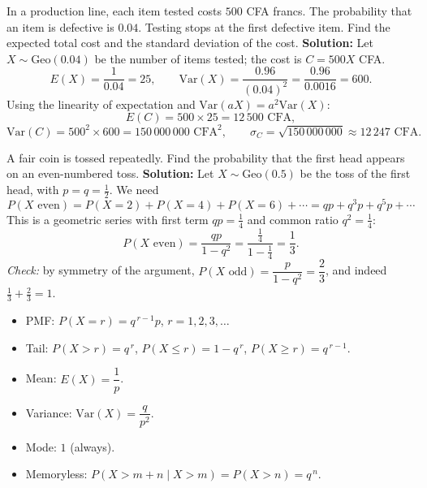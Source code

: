 \documentclass[11pt]{article}
\begin{document}
\begin{exoresolu}
In a production line, each item tested costs $500$ CFA francs. The probability that an item is defective is $0.04$. Testing stops at the first defective item. Find the expected total cost and the standard deviation of the cost.
\tcblower
\textbf{Solution:}
Let $X \sim \mathrm{Geo}(0.04)$ be the number of items tested; the cost is $C = 500X$ CFA.
\[
E(X) = \frac{1}{0.04} = 25, \qquad \mathrm{Var}(X) = \frac{0.96}{(0.04)^2} = \frac{0.96}{0.0016} = 600.
\]
Using the linearity of expectation and $\mathrm{Var}(aX)=a^2\mathrm{Var}(X)$:
\[
E(C) = 500 \times 25 = 12\,500 \text{ CFA},
\]
\[
\mathrm{Var}(C) = 500^2 \times 600 = 150\,000\,000 \text{ CFA}^2,
\qquad
\sigma_C = \sqrt{150\,000\,000} \approx 12\,247 \text{ CFA}.
\]
\end{exoresolu}

\begin{exoresolu}
A fair coin is tossed repeatedly. Find the probability that the first head appears on an even-numbered toss.
\tcblower
\textbf{Solution:}
Let $X \sim \mathrm{Geo}(0.5)$ be the toss of the first head, with $p=q=\tfrac12$. We need
\[
P(X \text{ even}) = P(X=2) + P(X=4) + P(X=6) + \cdots = qp + q^3p + q^5p + \cdots
\]
This is a geometric series with first term $qp = \tfrac14$ and common ratio $q^2 = \tfrac14$:
\[
P(X \text{ even}) = \frac{qp}{1-q^2} = \frac{\tfrac14}{1-\tfrac14} = \frac{1}{3}.
\]
\emph{Check:} by symmetry of the argument, $P(X \text{ odd}) = \dfrac{p}{1-q^2} = \dfrac{2}{3}$, and indeed $\tfrac13+\tfrac23=1$.
\end{exoresolu}

\begin{aretenir}
\begin{itemize}
\item PMF: $P(X=r)=q^{\,r-1}p$, $r=1,2,3,\dots$
\item Tail: $P(X>r)=q^{\,r}$, \quad $P(X\le r)=1-q^{\,r}$, \quad $P(X\ge r)=q^{\,r-1}$.
\item Mean: $E(X)=\dfrac{1}{p}$.
\item Variance: $\mathrm{Var}(X)=\dfrac{q}{p^2}$.
\item Mode: $1$ (always).
\item Memoryless: $P(X>m+n\mid X>m)=P(X>n)=q^{\,n}$.
\end{itemize}
\end{aretenir}
\end{document}
